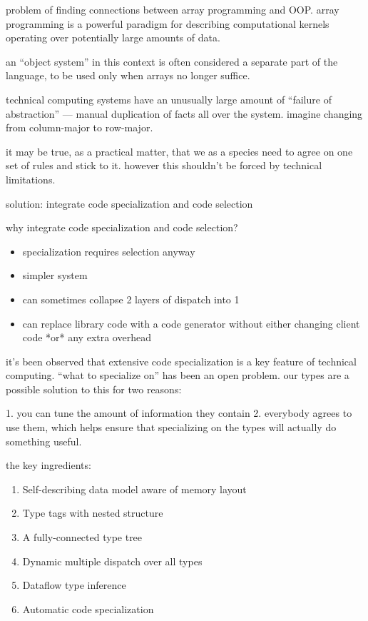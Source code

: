 problem of finding connections between array programming and OOP.
array programming is a powerful paradigm for describing computational
kernels operating over potentially large amounts of data.

an ``object system'' in this context is often considered a separate
part of the language, to be used only when arrays no longer
suffice.

technical computing systems have an unusually large amount of
``failure of abstraction'' --- manual duplication of facts
all over the system. imagine changing from column-major to
row-major.

it may be true, as a practical matter, that we as a species need to agree on
one set of rules and stick to it. however this shouldn't be forced by
technical limitations.



solution: integrate code specialization and code selection

why integrate code specialization and code selection?

\begin{itemize}
\item specialization requires selection anyway
\item simpler system
\item can sometimes collapse 2 layers of dispatch into 1
\item can replace library code with a code generator without either changing
  client code *or* any extra overhead
\end{itemize}

it's been observed that extensive code specialization is a key feature of
technical computing. ``what to specialize on'' has been an open problem.
our types are a possible solution to this for two reasons:

1. you can tune the amount of information they contain
2. everybody agrees to use them, which helps ensure that specializing on
the types will actually do something useful.



the key ingredients:

\begin{singlespace}
\begin{enumerate}
\item Self-describing data model aware of memory layout
\item Type tags with nested structure
\item A fully-connected type tree
\item Dynamic multiple dispatch over all types %
\item Dataflow type inference
\item Automatic code specialization
\end{enumerate}
\end{singlespace}


